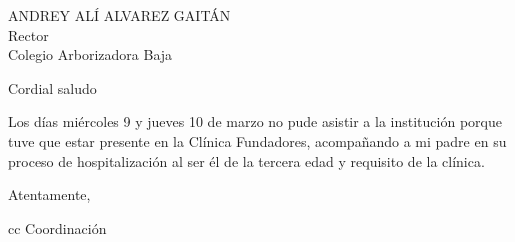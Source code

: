\documentclass[letterpaper,spanish]{letter}
\begin{document}
\begin{letter}{ANDREY ALÍ ALVAREZ GAITÁN\\Rector\\Colegio Arborizadora Baja}
	
\opening{Cordial saludo}
Los días miércoles 9 y jueves 10 de marzo no pude asistir a la institución porque tuve que estar presente en la Clínica Fundadores, acompañando a mi padre en su proceso de hospitalización al ser él de la tercera edad y requisito de la clínica.

\closing{Atentamente,}

cc{ Coordinación}

\end{letter}
\end{document}
